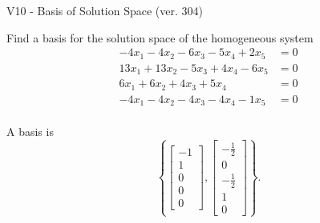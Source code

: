 \begin{exercise}
  \begin{exerciseTitle}V10 - Basis of Solution Space (ver. 304)\end{exerciseTitle}
  \begin{exerciseStatement}
    Find a basis for the solution space of the homogeneous system 
\begin{align*}
 -4 x_ 1 -4 x_ 2 -6 x_ 3 -5 x_ 4 + 2 x_ 5 &= 0  \\ 
  13 x_ 1 + 13 x_ 2 -5 x_ 3 + 4 x_ 4 -6 x_ 5 &= 0  \\ 
  6 x_ 1 + 6 x_ 2 + 4 x_ 3 + 5 x_ 4 &= 0  \\ 
  -4 x_ 1 -4 x_ 2 -4 x_ 3 -4 x_ 4 -1 x_ 5 &= 0  \\ 
 \end{align*}


 
  \end{exerciseStatement}

  \begin{exerciseAnswer}
   A basis is   
\[\left\{\left[\begin{array}{c}
-1 \\
1 \\
0 \\
0 \\
0
\end{array}\right] , \left[\begin{array}{c}
-\frac{1}{2} \\
0 \\
-\frac{1}{2} \\
1 \\
0
\end{array}\right]\right\}.\]

  


  \end{exerciseAnswer}
\end{exercise}